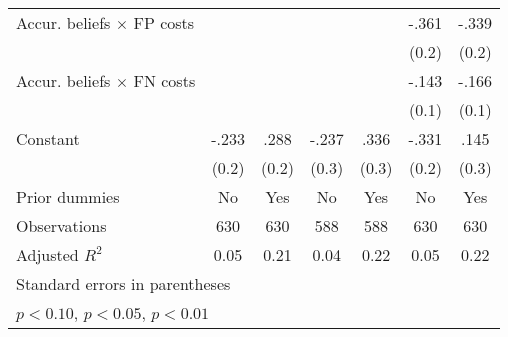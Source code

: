 \begin{table}[htbp]
\begin{tabular}{l*{6}{c}}
Accur. beliefs $\times$ FP costs&                  &                  &                  &                  &    -.361         &    -.339         \\
                &                  &                  &                  &                  &    (0.2)         &    (0.2)         \\
Accur. beliefs $\times$ FN costs&                  &                  &                  &                  &    -.143         &    -.166         \\
                &                  &                  &                  &                  &    (0.1)         &    (0.1)         \\
Constant        &    -.233         &     .288         &    -.237         &     .336         &    -.331         &     .145         \\
                &    (0.2)         &    (0.2)         &    (0.3)         &    (0.3)         &    (0.2)         &    (0.3)         \\
Prior dummies   &       No         &      Yes         &       No         &      Yes         &       No         &      Yes         \\
\hline
Observations    &      630         &      630         &      588         &      588         &      630         &      630         \\
Adjusted \(R^{2}\)&     0.05         &     0.21         &     0.04         &     0.22         &     0.05         &     0.22         \\
\hline\hline
\multicolumn{7}{l}{\footnotesize Standard errors in parentheses}\\
\multicolumn{7}{l}{\footnotesize \sym{*} \(p<0.10\), \sym{**} \(p<0.05\), \sym{***} \(p<0.01\)}\\
\end{tabular}
\end{table}
